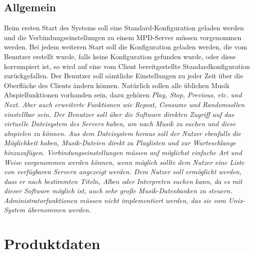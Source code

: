 \subsection{Allgemein}
Beim ersten Start des Systems soll eine Standard-Konfiguration geladen werden und die Verbindungseinstellungen
zu einem MPD-Server müssen vorgenommen werden. Bei jedem weiteren Start soll die Konfiguration geladen werden,
die vom Benutzer erstellt wurde, falls keine Konfiguration gefunden wurde, oder diese korrumpiert ist,
so wird auf eine vom Client bereitgestellte Standardkonfiguration zurückgefallen. Der Benutzer soll sämtliche
Einstellungen zu jeder Zeit über die Oberfläche des Clients ändern können.
Natürlich sollen alle üblichen Musik Abspielfunktionen vorhanden sein, dazu gehören \it Play, Stop, Previous, etc. und Next.\rm
Aber auch erweiterte Funktionen wie \it Repeat, Consume und Random\rm sollen einstellbar sein.
Der Benutzer soll über die Software direkten Zugriff auf das virtuelle Dateisystem des Servers haben, um nach Musik zu suchen und
diese abspielen zu können. Aus dem Dateisystem heraus soll der Nutzer ebenfalls die Möglichkeit haben, Musik-Dateien
direkt zu Playlisten und zur Warteschlange hinzuzufügen.
Verbindungseinstellungen müssen auf möglichst einfache Art und Weise vorgenommen werden können, wenn möglich
sollte dem Nutzer eine Liste von verfügbaren Servern angezeigt werden. 
Dem Nutzer soll ermöglicht werden, dass er nach bestimmten Titeln, Alben oder Interpreten suchen kann, da 
es mit dieser Software möglich ist, auch sehr große Musik-Datenbanken zu steuern.
Administratorfunktionen müssen nicht implementiert werden, das sie vom Unix-System übernommen werden.

\section{Produktdaten}

